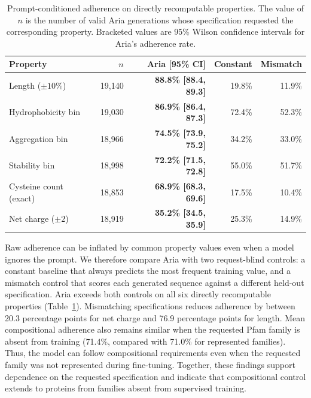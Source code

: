 \documentclass{article} %
\newcommand{\pct}{\%}
\begin{document}
\begin{table}[b]
\caption{Prompt-conditioned adherence on directly recomputable properties.
The value of $n$ is the number of valid Aria generations whose specification
requested the corresponding property. Bracketed values are 95\% Wilson
confidence intervals for Aria's adherence rate.\\}
\label{tab:controls}
\centering
\small
\begin{tabular}{lrrrr}
\toprule
Property
    & $n$
    & \textbf{Aria [95\% CI]}
    & Constant
    & Mismatch \\
\midrule
Length ($\pm10\pct$)
    & 19{,}140
    & \textbf{88.8\pct{} [88.4, 89.3]}
    & 19.8\pct
    & 11.9\pct \\
Hydrophobicity bin
    & 19{,}030
    & \textbf{86.9\pct{} [86.4, 87.3]}
    & 72.4\pct
    & 52.3\pct \\
Aggregation bin
    & 18{,}966
    & \textbf{74.5\pct{} [73.9, 75.2]}
    & 34.2\pct
    & 33.0\pct \\
Stability bin
    & 18{,}998
    & \textbf{72.2\pct{} [71.5, 72.8]}
    & 55.0\pct
    & 51.7\pct \\
Cysteine count (exact)
    & 18{,}853
    & \textbf{68.9\pct{} [68.3, 69.6]}
    & 17.5\pct
    & 10.4\pct \\
Net charge ($\pm2$)
    & 18{,}919
    & \textbf{35.2\pct{} [34.5, 35.9]}
    & 25.3\pct
    & 14.9\pct \\
\bottomrule
\end{tabular}
\end{table}

Raw adherence can be inflated by common property values even when a
model ignores the prompt. We therefore compare Aria with two
request-blind controls: a constant baseline that always predicts the
most frequent training value, and a mismatch control that scores each
generated sequence against a different held-out specification. Aria
exceeds both controls on all six directly recomputable properties
(Table~\ref{tab:controls}). Mismatching specifications reduces adherence
by between 20.3 percentage points for net charge and 76.9 percentage
points for length. Mean compositional adherence also remains similar
when the requested Pfam family is absent from training
(71.4\pct{}, compared with 71.0\pct{} for represented families). Thus, the model can follow compositional requirements even when the requested family was not represented during fine-tuning.
Together, these findings support dependence on the requested
specification and indicate that compositional control extends to
proteins from families absent from supervised training.
\end{document}
